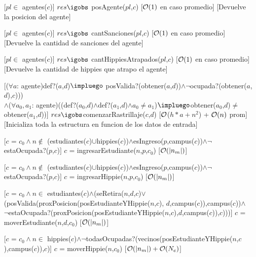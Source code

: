 \begin{Interfaz}
	[$pl \in$ agentes($c$)]
	{$res \igobs$ posAgente($pl$,$c$)}
	[$\mathcal{O}(1)$ en caso promedio]
	[Devuelve la posicion del agente]

	[$pl \in$ agentes($c$)]
	{$res \igobs$ cantSanciones($pl$,$c$)}
	[$\mathcal{O}(1)$ en caso promedio]
	[Devuelve la cantidad de sanciones del agente]
	
	[$pl \in$ agentes($c$)]
	{$res \igobs$ cantHippiesAtrapados($pl$,$c$)}
	[$\mathcal{O}(1)$ en caso promedio]
	[Devuelve la cantidad de hippies que atrapo el agente]

	[($\forall a$: agente)def?($a$,$d$)$\impluego$ posValida?(obtener($a$,$d$))$\land \neg$ocupada?(obtener($a$,$d$),$c$)))\\
  $\land$($\forall a_0,a_1$: agente)((def?($a_0$,$d$)$\land$def?($a_1$,$d$)$\land a_0 \neq a_1$)$\impluego$obtener($a_0$,$d$)$\neq$obtener($a_1$,$d$))]
	{$res \igobs $comenzarRastrillaje($c$,$d$)}%
	[$\mathcal{O}$($h*a + n^2$) + $\mathcal{O}(n)$ prom]
	[Inicializa toda la estructura en funcion de los datos de entrada]

	[$c$ = $c_0 \land n \notin$ (estudiantes($c$)$\cup$hippies($c$))$\land$esIngreso($p$,campus($c$))$\land \neg$ estaOcupada?($p$,$c$)]
	{$c$ = ingresarEstudiante($n$,$p$,$c_0$)}
	[$\mathcal{O}(|n_m|)$]
	
	[$c$ = $c_0 \land n \notin$  (estudiantes($c$)$\cup$hippies($c$))$\land$esIngreso($p$,campus($c$))$\land \neg$ estaOcupada?($p$,$c$)]
	{$c$ = ingresarHippie($n$,$p$,$c_0$)}
	[$\mathcal{O}(|n_m|)$]
	
	[$c$ = $c_0 \land n \in$ estudiantes($c$)$\land$(seRetira($n$,$d$,$c$)$\lor$\\(posValida(proxPosicion(posEstudianteYHippie($n$,$c$), $d$,campus($c$)),campus($c$))$\land$\\
	$\neg$estaOcupada?(proxPosicion(posEstudianteYHippie($n$,$c$),$d$,campus($c$)),$c$)))]
	{$c$ = moverEstudiante($n$,$d$,$c_0$)}
	[$\mathcal{O}(|n_m|)$]
	
	[$c$ = $c_0 \land n \in$ hippies($c$)$\land \neg$todasOcupadas?(vecinos(posEstudianteYHippie($n$,$c$),campus($c$)),$c$)]
	{$c$ = moverHippie($n$,$c_0$)}
	[$\mathcal{O}(|n_m|) + \mathcal{O}(N_e)$]


\end{Interfaz}
